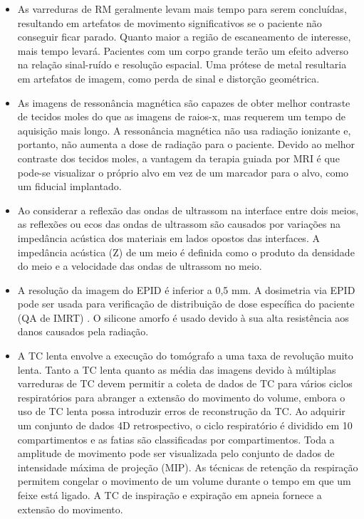 \documentclass[11pt,a4paper]{article}
\newcounter{exemplo}
\begin{document}
\begin{exemplo}[Imagens]
\begin{itemize}
        \item As varreduras de RM geralmente levam mais tempo para serem concluídas, resultando em artefatos de movimento significativos se o paciente não conseguir ficar parado. Quanto maior a região de escaneamento de interesse, mais tempo levará. Pacientes com um corpo grande terão um efeito adverso na relação sinal-ruído e resolução espacial. Uma prótese de metal resultaria em artefatos de imagem, como perda de sinal e distorção geométrica.
        
        \item As imagens de ressonância magnética são capazes de obter melhor contraste de tecidos moles do que as imagens de raios-x, mas requerem um tempo de aquisição mais longo. A ressonância magnética não usa radiação ionizante e, portanto, não aumenta a dose de radiação para o paciente. Devido ao melhor contraste dos tecidos moles, a vantagem da terapia guiada por MRI é que pode-se visualizar o próprio alvo em vez de um marcador para o alvo, como um fiducial implantado.
        
        \item Ao considerar a reflexão das ondas de ultrassom na interface entre dois meios, as reflexões ou ecos das ondas de ultrassom são causados por variações na impedância acústica dos materiais em lados opostos das interfaces. A impedância acústica (Z) de um meio é definida como o produto da densidade do meio e a velocidade das ondas de ultrassom no meio.        
        
        \item A resolução da imagem do EPID é inferior a 0,5 mm. A dosimetria via EPID pode ser usada para verificação de distribuição de dose específica do paciente (QA de IMRT) . O silicone amorfo é usado devido à sua alta resistência aos danos causados pela radiação.
        
        \item A TC lenta envolve a execução do tomógrafo a uma taxa de revolução muito lenta. Tanto a TC lenta quanto as média das imagens devido à múltiplas varreduras de TC devem permitir a coleta de dados de TC para vários ciclos respiratórios para abranger a extensão do movimento do volume, embora o uso de TC lenta possa introduzir erros de reconstrução da TC. Ao adquirir um conjunto de dados 4D retrospectivo, o ciclo respiratório é dividido em 10 compartimentos e as fatias são classificadas por compartimentos. Toda a amplitude de movimento pode ser visualizada pelo conjunto de dados de intensidade máxima de projeção (MIP). As técnicas de retenção da respiração permitem congelar o movimento de um volume durante o tempo em que um feixe está ligado. A TC de inspiração e expiração em apneia fornece a extensão do movimento.
        

\end{itemize}
\end{exemplo}
\end{document}
